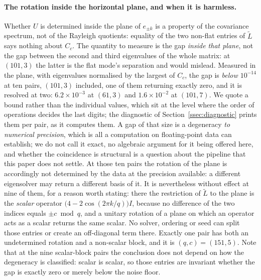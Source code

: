 \documentclass[11pt,a4paper]{article}
\begin{document}
    \paragraph{The rotation inside the horizontal plane, and when it is harmless.}
      Whether $U$ is determined inside the plane of $e_{\pm k}$ is a property of the covariance
      spectrum, not of the Rayleigh quotients: equality of the two non-flat entries of $\tilde L$
      says nothing about $C_c$.
      The quantity to measure is the gap \emph{inside that plane}, not the gap between the second
      and third eigenvalues of the whole matrix: at $(101,3)$ the latter is the flat mode's
      separation and would mislead.
      Measured in the plane, with eigenvalues normalised by the largest of $C_c$, the gap is
      \emph{below $10^{-14}$} at ten pairs, $(101,3)$ included, one of them returning exactly zero,
      and it is resolved at two: $6.2 \times 10^{-3}$ at $(61,3)$ and $1.6 \times 10^{-2}$ at
      $(101,7)$.
      We quote a bound rather than the individual values, which sit at the level where the order of
      operations decides the last digits; the diagnostic of Section~\ref{ssec:diagnostic} prints
      them per pair, as it computes them.
      A gap of that size is a degeneracy \emph{to numerical precision}, which is all a computation
      on floating-point data can establish; we do not call it exact, no algebraic argument for it
      being offered here, and whether the coincidence is structural is a question about the
      pipeline that this paper does not settle.
      At those ten pairs the rotation of the plane is accordingly not determined by the data at
      the precision available: a different eigensolver may return a different basis of it.
      It is nevertheless without effect at nine of them, for a reason worth stating: there the
      restriction of $\tilde L$ to the plane is the \emph{scalar} operator
      $\bigl(4 - 2\cos(2\pi k/q)\bigr) I$, because no difference of the two indices equals
      $\pm c \bmod q$, and a unitary rotation of a plane on which an operator acts as a scalar
      returns the same scalar.
      No solver, ordering or seed can split those entries or create an off-diagonal term there.
      Exactly one pair has both an undetermined rotation and a non-scalar block, and it is
      $(q,c) = (151,5)$.
      Note that at the nine scalar-block pairs the conclusion does not depend on how the
      degeneracy is classified: scalar is scalar, so those entries are invariant whether the gap is
      exactly zero or merely below the noise floor.
\end{document}
